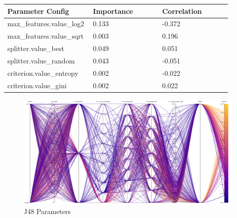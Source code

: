 \documentclass[11pt]{article}
\begin{document}
  \begin{table}[ht]
    \centering
    \begin{tabular}{|p{0.3\linewidth} | p{0.3\linewidth}| p{0.3\linewidth}|} 
      \hline
      \textbf{Parameter Config}  & \textbf{Importance} & \textbf{Correlation} \\ \hline
        max\_features.value\_log2 & 0.133 & -0.372 \\ \hline
        max\_features.value\_sqrt & 0.003 & 0.196 \\ \hline
        splitter.value\_best & 0.049 & 0.051 \\ \hline
        splitter.value\_random & 0.043 & -0.051 \\ \hline
        criterion.value\_entropy & 0.002 & -0.022 \\ \hline
        criterion.value\_gini & 0.002 & 0.022 \\ \hline

    \end{tabular}
  \end{table}\label{J48_ParamImp2}

\begin{figure}[h]
  \caption {J48 Parameters} \label{ParallelCoordJ48}
  \centering 
  \includegraphics[width = \textwidth, height = \textwidth, keepaspectratio]{Images/J48 ParallelCoordGraph.png}
\end{figure}
\end{document}
